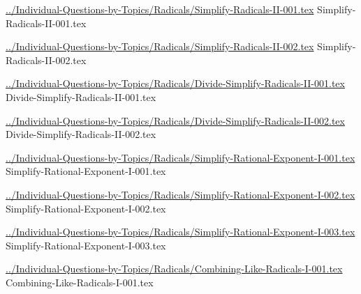 \documentclass[answer,cancelspace,12pt]{exam}
\begin{document}
\begin{questions}
\question
\href{../Individual-Questions-by-Topics/Radicals/Simplify-Radicals-II-001.tex}{../Individual-Questions-by-Topics/Radicals/Simplify-Radicals-II-001.tex}
{Simplify-Radicals-II-001.tex}


\question
\href{../Individual-Questions-by-Topics/Radicals/Simplify-Radicals-II-002.tex}{../Individual-Questions-by-Topics/Radicals/Simplify-Radicals-II-002.tex}
{Simplify-Radicals-II-002.tex}

\question
\href{../Individual-Questions-by-Topics/Radicals/Divide-Simplify-Radicals-II-001.tex}{../Individual-Questions-by-Topics/Radicals/Divide-Simplify-Radicals-II-001.tex}
{Divide-Simplify-Radicals-II-001.tex}


\question
\href{../Individual-Questions-by-Topics/Radicals/Divide-Simplify-Radicals-II-002.tex}{../Individual-Questions-by-Topics/Radicals/Divide-Simplify-Radicals-II-002.tex}
{Divide-Simplify-Radicals-II-002.tex}


\question
\href{../Individual-Questions-by-Topics/Radicals/Simplify-Rational-Exponent-I-001.tex}{../Individual-Questions-by-Topics/Radicals/Simplify-Rational-Exponent-I-001.tex}
{Simplify-Rational-Exponent-I-001.tex}


\question
\href{../Individual-Questions-by-Topics/Radicals/Simplify-Rational-Exponent-I-002.tex}{../Individual-Questions-by-Topics/Radicals/Simplify-Rational-Exponent-I-002.tex}
{Simplify-Rational-Exponent-I-002.tex}


\question
\href{../Individual-Questions-by-Topics/Radicals/Simplify-Rational-Exponent-I-003.tex}{../Individual-Questions-by-Topics/Radicals/Simplify-Rational-Exponent-I-003.tex}
{Simplify-Rational-Exponent-I-003.tex}

\question
\href{../Individual-Questions-by-Topics/Radicals/Combining-Like-Radicals-I-001.tex}{../Individual-Questions-by-Topics/Radicals/Combining-Like-Radicals-I-001.tex}
{Combining-Like-Radicals-I-001.tex}




\end{questions}
\end{document}
